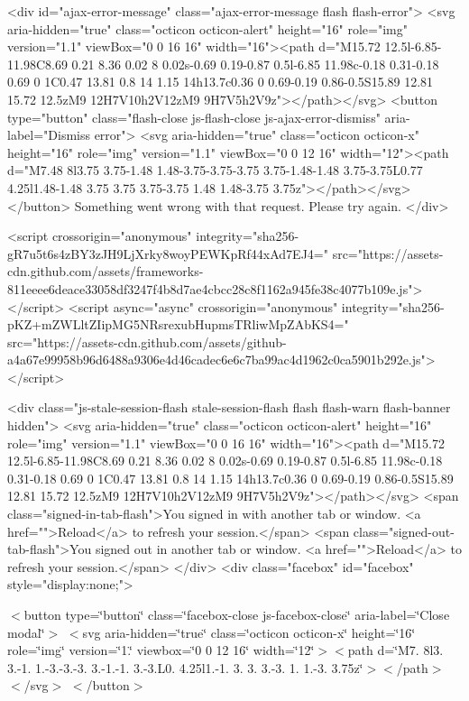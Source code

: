 \begin{DoxyVerb}<div id="ajax-error-message" class="ajax-error-message flash flash-error">
  <svg aria-hidden="true" class="octicon octicon-alert" height="16" role="img" version="1.1" viewBox="0 0 16 16" width="16"><path d="M15.72 12.5l-6.85-11.98C8.69 0.21 8.36 0.02 8 0.02s-0.69 0.19-0.87 0.5l-6.85 11.98c-0.18 0.31-0.18 0.69 0 1C0.47 13.81 0.8 14 1.15 14h13.7c0.36 0 0.69-0.19 0.86-0.5S15.89 12.81 15.72 12.5zM9 12H7V10h2V12zM9 9H7V5h2V9z"></path></svg>
  <button type="button" class="flash-close js-flash-close js-ajax-error-dismiss" aria-label="Dismiss error">
    <svg aria-hidden="true" class="octicon octicon-x" height="16" role="img" version="1.1" viewBox="0 0 12 16" width="12"><path d="M7.48 8l3.75 3.75-1.48 1.48-3.75-3.75-3.75 3.75-1.48-1.48 3.75-3.75L0.77 4.25l1.48-1.48 3.75 3.75 3.75-3.75 1.48 1.48-3.75 3.75z"></path></svg>
  </button>
  Something went wrong with that request. Please try again.
</div>



  <script crossorigin="anonymous" integrity="sha256-gR7u5t6s4zBY3zJH9LjXrky8woyPEWKpRf44xAd7EJ4=" src="https://assets-cdn.github.com/assets/frameworks-811eeee6deace33058df3247f4b8d7ae4cbcc28c8f1162a945fe38c4077b109e.js"></script>
  <script async="async" crossorigin="anonymous" integrity="sha256-pKZ+mZWLltZIipMG5NRsrexubHupmsTRliwMpZAbKS4=" src="https://assets-cdn.github.com/assets/github-a4a67e99958b96d6488a9306e4d46cadec6e6c7ba99ac4d1962c0ca5901b292e.js"></script>



<div class="js-stale-session-flash stale-session-flash flash flash-warn flash-banner hidden">
  <svg aria-hidden="true" class="octicon octicon-alert" height="16" role="img" version="1.1" viewBox="0 0 16 16" width="16"><path d="M15.72 12.5l-6.85-11.98C8.69 0.21 8.36 0.02 8 0.02s-0.69 0.19-0.87 0.5l-6.85 11.98c-0.18 0.31-0.18 0.69 0 1C0.47 13.81 0.8 14 1.15 14h13.7c0.36 0 0.69-0.19 0.86-0.5S15.89 12.81 15.72 12.5zM9 12H7V10h2V12zM9 9H7V5h2V9z"></path></svg>
  <span class="signed-in-tab-flash">You signed in with another tab or window. <a href="">Reload</a> to refresh your session.</span>
  <span class="signed-out-tab-flash">You signed out in another tab or window. <a href="">Reload</a> to refresh your session.</span>
</div>
<div class="facebox" id="facebox" style="display:none;">
\end{DoxyVerb}
    $<$button type=\char`\"{}button\char`\"{} class=\char`\"{}facebox-\/close js-\/facebox-\/close\char`\"{} aria-\/label=\char`\"{}\+Close modal\char`\"{}$>$ $<$svg aria-\/hidden=\char`\"{}true\char`\"{} class=\char`\"{}octicon octicon-\/x\char`\"{} height=\char`\"{}16\char`\"{} role=\char`\"{}img\char`\"{} version=\char`\"{}1.\char`\"{} viewbox=\char`\"{}0 0 12 16\char`\"{} width=\char`\"{}12\char`\"{}$>$$<$path d=\char`\"{}\+M7. 8l3. 3.-\/1. 1.-\/3.-\/3.-\/3. 3.-\/1.-\/1. 3.-\/3.\+L0. 4.\+25l1.-\/1. 3. 3. 3.-\/3. 1. 1.-\/3. 3.\+75z\char`\"{}$>$$<$/path$>$$<$/svg$>$ $<$/button$>$  

